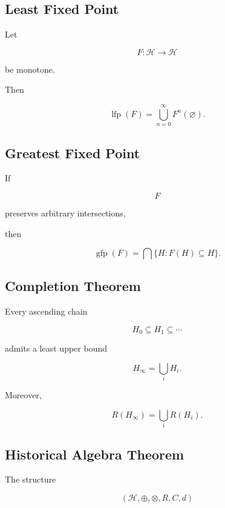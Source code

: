 \documentclass[12pt,oneside]{article}
\theoremstyle{definition}
\theoremstyle{remark}
\begin{document}
\subsection*{Least Fixed Point}

Let

\[
F:\mathcal H\rightarrow\mathcal H
\]

be monotone.

Then

\[
\operatorname{lfp}(F)
=
\bigcup_{n=0}^{\infty}
F^n(\varnothing).
\]

\subsection*{Greatest Fixed Point}

If

\[
F
\]

preserves arbitrary intersections,

then

\[
\operatorname{gfp}(F)
=
\bigcap
\{
H
:
F(H)\subseteq H
\}.
\]

\subsection*{Completion Theorem}

Every ascending chain

\[
H_0
\subseteq
H_1
\subseteq
\cdots
\]

admits a least upper bound

\[
H_\infty
=
\bigcup_i
H_i.
\]

Moreover,

\[
R(H_\infty)
=
\bigcup_i
R(H_i).
\]

\subsection*{Historical Algebra Theorem}

The structure

\[
\boxed{
(
\mathcal H,
\oplus,
\otimes,
R,
C,
d
)
}
\]
\end{document}

